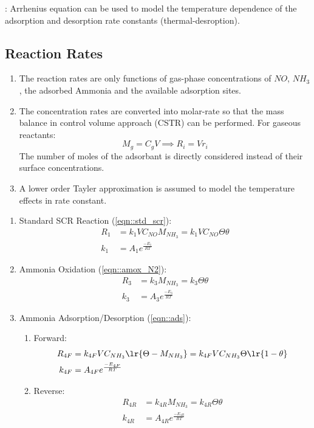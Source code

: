 : Arrhenius equation can be used to model the temperature dependence
of the adsorption and desorption rate constants (thermal-desroption).


\subsection{Reaction Rates}
\begin{enumerate}
\item The reaction rates are only functions of gas-phase concentrations of $NO$,
$NH_3$, the adsorbed Ammonia and the available adsorption sites.

\item The concentration rates are converted into molar-rate so that the
mass balance in control volume approach (CSTR) can be performed. For gaseous reactants:
$$ M_g = C_g V \implies R_i = V r_i $$
The number of moles of the adsorbant is directly considered instead of their
surface concentrations.

\item A lower order Tayler approximation is assumed to model the temperature
effects in rate constant.
\end{enumerate}

\begin{enumerate}
\item Standard SCR Reaction (\ref{eqn::std_scr}):
\begin{align*}
    R_1 &= k_1 V C_{NO} M_{NH_3} = k_1V C_{NO} \Theta \theta\\
    k_1 &= A_1 e^{\frac{-E_1}{RT}}
\end{align*}

\item Ammonia Oxidation (\ref{eqn::amox_N2}):
\begin{align*}
    R_3 &= k_3 M_{NH_3} = k_3 \Theta \theta\\
    k_3 &= A_3 e^{\frac{-E_3}{RT}}
\end{align*}

\item Ammonia Adsorption/Desorption (\ref{eqn::ads}):
\begin{enumerate}
\item Forward:
\begin{align*}
    R_{4F} &= k_{4F} V C_{NH_3} \lr{\Theta - M_{NH_3}}
            = k_{4F} V C_{NH_3} \Theta \lr{1 - \theta}\\
    k_{4F} &= A_{4F} e^{\frac{-E_{4F}}{RT}}
\end{align*}

\item Reverse:
\begin{align*}
    R_{4R} &= k_{4R} M_{NH_3}
            = k_{4R} \Theta \theta \\
    k_{4R} &= A_{4R} e^{\frac{-E_{4R}}{RT}}
\end{align*}
\end{enumerate}
\end{enumerate}

